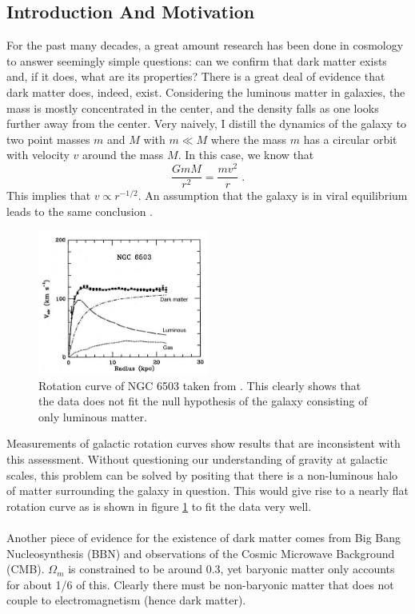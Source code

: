 \documentclass[aps,reprint,prl]{revtex4-1}
\begin{document}
\subsection*{Introduction And Motivation}
For the past many decades, a great amount research has been done in cosmology to answer seemingly simple questions: can we confirm that dark matter exists and, if it does, what are its properties?  There is a great deal of evidence that dark matter does, indeed, exist.  Considering the luminous matter in galaxies, the mass is mostly concentrated in the center, and the density falls as one looks further away from the center.  Very naively, I distill the dynamics of the galaxy to two point masses $m$ and $M$ with $m\ll M$ where the mass $m$ has a circular orbit with velocity $v$ around the mass $M$.  In this case, we know that 
$$\frac{GmM}{r^2}=\frac{mv^2}{r}\;.$$
This implies that $v\propto r^{-1/2}$.  An assumption that the galaxy is in viral equilibrium leads to the same conclusion \cite{TASIOlive}.
\begin{figure}[h]
\includegraphics[width=0.5\textwidth]{rotationcurve}
\caption{Rotation curve of NGC 6503 taken from \cite{begman}.  This clearly shows that the data does not fit the null hypothesis of the galaxy consisting of only luminous matter.}
\label{fig:rotationcurve}
\end{figure}
Measurements of galactic rotation curves show results that are inconsistent with this assessment. Without questioning our understanding of gravity at galactic scales, this problem can be solved by positing that there is a non-luminous halo of matter surrounding the galaxy in question.  This would give rise to a nearly flat rotation curve as is shown in figure \ref{fig:rotationcurve} to fit the data very well.
\\ \\
Another piece of evidence for the existence of dark matter comes from Big Bang Nucleosynthesis (BBN) and observations of the Cosmic Microwave Background (CMB).  $\Omega_m$ is constrained to be around 0.3, yet baryonic matter only accounts for about 1/6 of this.  Clearly there must be non-baryonic matter that does not couple to electromagnetism (hence dark matter). 
\end{document}
